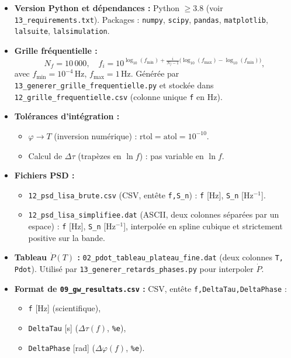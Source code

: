 \begin{itemize}
  \item \textbf{Version Python et dépendances :}  
    Python \(\ge3.8\) (voir \texttt{13\_requirements.txt}).  
    Packages : \texttt{numpy}, \texttt{scipy}, \texttt{pandas}, \texttt{matplotlib}, \texttt{lalsuite}, \texttt{lalsimulation}.

  \item \textbf{Grille fréquentielle :}  
    \[
      N_{f} = 10\,000,\quad
      f_{i} = 10^{\log_{10}(f_{\min}) + \frac{i}{N_{f}-1}\bigl(\log_{10}(f_{\max})-\log_{10}(f_{\min})\bigr)},
      \]
    avec \(f_{\min}=10^{-4}\,\mathrm{Hz}\), \(f_{\max}=1\,\mathrm{Hz}\).  
    Générée par \texttt{13\_generer\_grille\_frequentielle.py} et stockée dans \texttt{12\_grille\_frequentielle.csv} (colonne unique \texttt{f} en Hz).

  \item \textbf{Tolérances d’intégration :}
    \begin{itemize}
      \item \(\varphi\to T\) (inversion numérique) : \(\mathrm{rtol}=\mathrm{atol}=10^{-10}\).  
      \item Calcul de \(\Delta\tau\) (trapèzes en \(\ln f\)) : pas variable en \(\ln f\).
    \end{itemize}

  \item \textbf{Fichiers PSD :}
    \begin{itemize}
      \item \texttt{12\_psd\_lisa\_brute.csv} (CSV, entête \texttt{f,S\_n}) :  
        \texttt{f} [Hz], \texttt{S\_n} [Hz\(^{-1}\)].  
      \item \texttt{12\_psd\_lisa\_simplifiee.dat} (ASCII, deux colonnes séparées par un espace) :  
        \texttt{f} [Hz], \texttt{S\_n} [Hz\(^{-1}\)], interpolée en spline cubique et strictement positive sur la bande.
    \end{itemize}

  \item \textbf{Tableau \(\dot P(T)\) :}  
    \texttt{02\_pdot\_tableau\_plateau\_fine.dat} (deux colonnes \texttt{T, Pdot}).  
    Utilisé par \texttt{13\_generer\_retards\_phases.py} pour interpoler \(\dot P\).

  \item \textbf{Format de \texttt{09\_gw\_resultats.csv} :}  
    CSV, entête \texttt{f,DeltaTau,DeltaPhase} :
    \begin{itemize}
      \item \texttt{f} [Hz] (scientifique),  
      \item \texttt{DeltaTau} [s] (\(\Delta\tau(f)\), \texttt{\%e}),  
      \item \texttt{DeltaPhase} [rad] (\(\Delta\varphi(f)\), \texttt{\%e}).
    \end{itemize}


\end{itemize}
